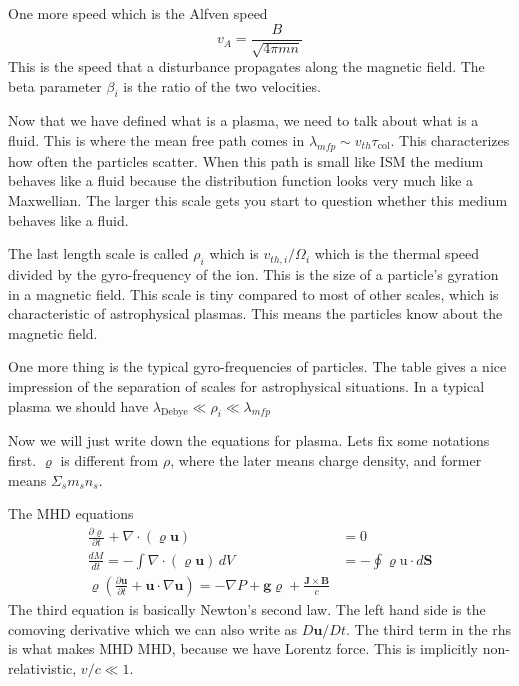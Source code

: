 \documentclass[letterpaper, 11pt]{article}
\numberwithin{equation}{section}
\numberwithin{figure}{section}
\begin{document}
One more speed which is the Alfven speed
\begin{equation}
  \label{eq:4}
  v_A = \frac{B}{\sqrt{4\pi mn}}
\end{equation}
This is the speed that a disturbance propagates along the magnetic field. The
beta parameter $\beta_i$ is the ratio of the two velocities.

Now that we have defined what is a plasma, we need to talk about what is a
fluid. This is where the mean free path comes in $\lambda_{mfp}\sim
v_{th}\tau_\mathrm{col}$. This characterizes how often the particles scatter.
When this path is small like ISM the medium behaves like a fluid because the
distribution function looks very much like a Maxwellian. The larger this scale
gets you start to question whether this medium behaves like a fluid.

The last length scale is called $\rho_i$ which is $v_{th,i} / \Omega_i$ which is
the thermal speed divided by the gyro-frequency of the ion. This is the size of
a particle's gyration in a magnetic field. This scale is tiny compared to
most of other scales, which is characteristic of astrophysical plasmas. This
means the particles know about the magnetic field.

One more thing is the typical gyro-frequencies of particles. The table gives a
nice impression of the separation of scales for astrophysical situations. In a
typical plasma we should have $\lambda_\mathrm{Debye} \ll \rho_i \ll \lambda_{mfp}$

Now we will just write down the equations for plasma. Lets fix some notations
first. $\varrho$ is different from $\rho$, where the later means charge density,
and former means $\Sigma_sm_sn_s$.

The MHD equations
\begin{align}
  \frac{\partial\varrho}{\partial t} + \nabla\cdot(\varrho \mathbf{u}) &= 0 \\
  \frac{dM}{dt} = -\int \nabla\cdot(\varrho \mathbf{u})\,dV &= -\oint \varrho \mathrm{u}\cdot d\mathbf{S} \\
  \varrho \left( \frac{\partial \mathbf{u}}{\partial t} + \mathbf{u}\cdot \nabla \mathbf{u} \right) = -\nabla P + \mathbf{g}\varrho + \frac{\mathbf{J}\times\mathbf{B}}{c}
\end{align}
The third equation is basically Newton's second law. The left hand side is the
comoving derivative which we can also write as $D \mathbf{u}/Dt$. The third term
in the rhs is what makes MHD MHD, because we have Lorentz force. This is
implicitly non-relativistic, $v/c\ll 1$.
\end{document}
